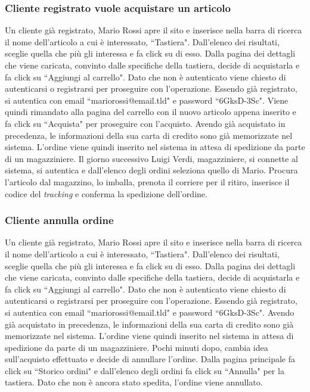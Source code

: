 \documentclass[12pt]{article}
\begin{document}
\subsubsection{Cliente registrato vuole acquistare un articolo}
Un cliente già registrato, Mario Rossi apre il sito e inserisce nella barra di ricerca il nome dell'articolo a cui è interessato, ``Tastiera".
Dall'elenco dei risultati, sceglie quella che più gli interessa e fa click su di esso.
Dalla pagina dei dettagli che viene caricata, convinto dalle specifiche della tastiera, decide di acquistarla e fa click su ``Aggiungi al carrello".
Dato che non è autenticato viene chiesto di autenticarsi o registrarsi per proseguire con l'operazione.
Essendo già registrato, si autentica con email ``mariorossi@email.tld" e password ``6GksD-3Sc".
Viene quindi rimandato alla pagina del carrello con il nuovo articolo appena inserito e fa click su ``Acquista" per proseguire con l'acquisto.
Avendo già acquistato in precedenza, le informazioni della sua carta di credito sono già memorizzate nel sistema.
L'ordine viene quindi inserito nel sistema in attesa di spedizione da parte di un magazziniere.
Il giorno successivo Luigi Verdi, magazziniere, si connette al sistema, si autentica e dall'elenco degli ordini seleziona quello di Mario. Procura l'articolo dal magazzino, lo imballa, prenota il corriere per il ritiro, inserisce il codice del \emph{tracking} e conferma la spedizione dell'ordine.

\subsubsection{Cliente annulla ordine}
Un cliente già registrato, Mario Rossi apre il sito e inserisce nella barra di ricerca il nome dell'articolo a cui è interessato, ``Tastiera".
Dall'elenco dei risultati, sceglie quella che più gli interessa e fa click su di esso.
Dalla pagina dei dettagli che viene caricata, convinto dalle specifiche della tastiera, decide di acquistarla e fa click su ``Aggiungi al carrello".
Dato che non è autenticato viene chiesto di autenticarsi o registrarsi per proseguire con l'operazione.
Essendo già registrato, si autentica con email ``mariorossi@email.tld" e password ``6GksD-3Sc".
Avendo già acquistato in precedenza, le informazioni della sua carta di credito sono già memorizzate nel sistema.
L'ordine viene quindi inserito nel sistema in attesa di spedizione da parte di un magazziniere.
Pochi minuti dopo, cambia idea sull'acquisto effettuato e decide di annullare l'ordine.
Dalla pagina principale fa click su ``Storico ordini" e dall'elenco degli ordini fa click su ``Annulla" per la tastiera.
Dato che non è ancora stato spedita, l'ordine viene annullato.
\end{document}
